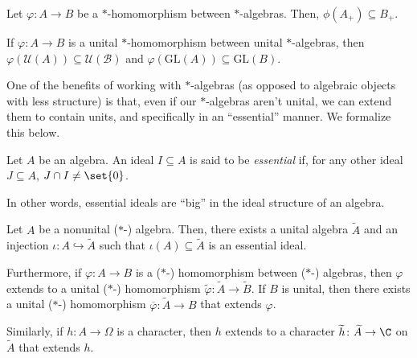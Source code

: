 \begin{fact}\label{fact:positivity_homomorphisms}
  Let $\varphi\colon A\rightarrow B$ be a $\ast$-homomorphism between $\ast$-algebras. Then, $\phi\left( A_{+} \right)\subseteq B_{+}$.
\end{fact}
\begin{fact}\label{fact:unitary_preservation}
  If $\varphi\colon A\rightarrow B$ is a unital $\ast$-homomorphism between unital $\ast$-algebras, then $\varphi\left( \mathcal{U}\left( A \right) \right)\subseteq \mathcal{U}\left( \mathcal{B} \right)$ and $\varphi\left( \text{GL}\left( A \right) \right)\subseteq \text{GL}\left( B \right) $.
\end{fact}

One of the benefits of working with $\ast$-algebras (as opposed to algebraic objects with less structure) is that, even if our $\ast$-algebras aren't unital, we can extend them to contain units, and specifically in an ``essential'' manner. We formalize this below.
\begin{definition}
  Let $A$ be an algebra. An ideal $I\subseteq A$ is said to be \textit{essential} if, for any other ideal $J\subseteq A$, $J\cap I \neq \set{0}$.
\end{definition}
In other words, essential ideals are ``big'' in the ideal structure of an algebra.
\begin{theorem}
  Let $A$ be a nonunital ($\ast$-) algebra. Then, there exists a unital algebra $\widetilde{A}$ and an injection $\iota\colon A\hookrightarrow \widetilde{A}$ such that $\iota(A)\subseteq \widetilde{A}$ is an essential ideal.\newline

  Furthermore, if $\varphi\colon A\rightarrow B$ is a ($\ast$-) homomorphism between ($\ast$-) algebras, then $\varphi$ extends to a unital ($\ast$-) homomorphism $\widetilde{\varphi}\colon \widetilde{A}\rightarrow \widetilde{B}$. If $B$ is unital, then there exists a unital ($\ast$-) homomorphism $\overline{\varphi}\colon \widetilde{A}\rightarrow B$ that extends $\varphi$.\newline

  Similarly, if $h\colon A\rightarrow \Omega$ is a character, then $h$ extends to a character $\widetilde{h}\colon \widetilde{A}\rightarrow \C$ on $\widetilde{A}$ that extends $h$.
\end{theorem}
